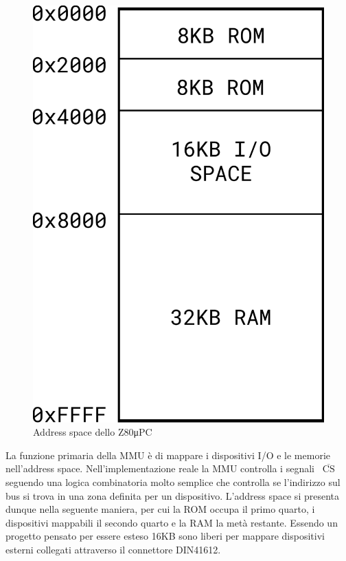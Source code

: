 \documentclass[a4paper, 11pt, twoside]{article}
\newcommand{\prj}{Z80μPC\xspace}
\newcommand{\inv}[1]{$\overline{\mbox{#1}}$}
\begin{document}
\begin{figure} \centering
    \vspace{8mm}
    \includegraphics[width=.9\linewidth]{res/addrspace}
    \vspace{4mm}
    \caption{Address space dello \prj}
\end{figure}
La funzione primaria della MMU \`e di mappare i dispositivi I/O e le memorie
nell'address space. Nell'implementazione reale la MMU controlla i segnali {\tt
\inv{CS}} seguendo una logica combinatoria molto semplice che controlla se
l'indirizzo sul bus si trova in una zona definita per un dispositivo.
L'address space si presenta dunque nella seguente maniera, per cui la ROM
occupa il primo quarto, i dispositivi mappabili il secondo quarto e la RAM la
met\`a restante. Essendo un progetto pensato per essere esteso 16KB sono
liberi per mappare dispositivi esterni collegati attraverso il connettore 
DIN41612.

\end{document}
